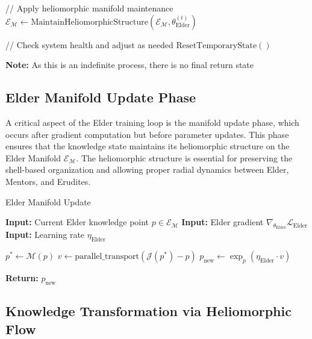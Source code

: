\begin{algorithm}
\begin{algorithmic}[1]
    \State // Apply heliomorphic manifold maintenance
    \State $\mathcal{E}_{\mathcal{M}} \gets \text{MaintainHeliomorphicStructure}(\mathcal{E}_{\mathcal{M}}, \theta_{\text{Elder}}^{(t)})$
    
    \State // Check system health and adjust as needed
        \State $\text{ResetTemporaryState}()$ 
    \EndIf
\EndWhile

\State \textbf{Note:} As this is an indefinite process, there is no final return state
\end{algorithmic}
\end{algorithm}

\subsection{Elder Manifold Update Phase}

A critical aspect of the Elder training loop is the manifold update phase, which occurs after gradient computation but before parameter updates. This phase ensures that the knowledge state maintains its heliomorphic structure on the Elder Manifold $\mathcal{E}_{\mathcal{M}}$. The heliomorphic structure is essential for preserving the shell-based organization and allowing proper radial dynamics between Elder, Mentors, and Erudites.

\begin{algorithm}
\caption{Elder Manifold Update}
\begin{algorithmic}[1]
\State \textbf{Input:} Current Elder knowledge point $p \in \mathcal{E}_{\mathcal{M}}$
\State \textbf{Input:} Elder gradient $\nabla_{\theta_{\text{Elder}}} \mathcal{L}_{\text{Elder}}$
\State \textbf{Input:} Learning rate $\eta_{\text{Elder}}$

\State $p^* \gets \mathcal{M}(p)$ 
\State $v \gets \text{parallel\_transport}(\mathcal{J}(p^*) - p)$ 
\State $p_{\text{new}} \gets \exp_p(\eta_{\text{Elder}} \cdot v)$ 

\State \textbf{Return:} $p_{\text{new}}$
\end{algorithmic}
\end{algorithm}

\subsection{Knowledge Transformation via Heliomorphic Flow}

